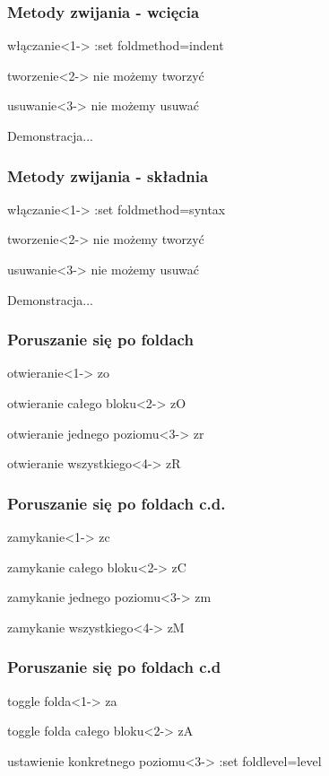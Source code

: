 \documentclass[10pt]{beamer}
\begin{document}
\begin{frame}
	\frametitle{Metody zwijania - wcięcia}
	\begin{block}{włączanie}<1->
	:set foldmethod=indent
	\end{block}
	\begin{block}{tworzenie}<2->
	nie możemy tworzyć
	\end{block}
	\begin{block}{usuwanie}<3->
	nie możemy usuwać
	\end{block}
	{
		Demonstracja...
	}
\end{frame}
\begin{frame}
	\frametitle{Metody zwijania - składnia}
	\begin{block}{włączanie}<1->
	:set foldmethod=syntax
	\end{block}
	\begin{block}{tworzenie}<2->
	nie możemy tworzyć
	\end{block}
	\begin{block}{usuwanie}<3->
	nie możemy usuwać
	\end{block}
	{
		Demonstracja...
	}
\end{frame}
\begin{frame}
	\frametitle{Poruszanie się po foldach}
	\begin{block}{otwieranie}<1->
	zo
	\end{block}
	\begin{block}{otwieranie całego bloku}<2->
	zO
	\end{block}
	\begin{block}{otwieranie jednego poziomu}<3->
	zr
	\end{block}
	\begin{block}{otwieranie wszystkiego}<4->
	zR
	\end{block}
\end{frame}
\begin{frame}
	\frametitle{Poruszanie się po foldach c.d.}
	\begin{block}{zamykanie}<1->
	zc
	\end{block}
	\begin{block}{zamykanie całego bloku}<2->
	zC
	\end{block}
	\begin{block}{zamykanie jednego poziomu}<3->
	zm
	\end{block}
	\begin{block}{zamykanie wszystkiego}<4->
	zM
	\end{block}
\end{frame}
\begin{frame}
	\frametitle{Poruszanie się po foldach c.d}
	\begin{block}{toggle folda}<1->
	za
	\end{block}
	\begin{block}{toggle folda całego bloku}<2->
	zA
	\end{block}
	\begin{block}{ustawienie konkretnego poziomu}<3->
	:set foldlevel=level
	\end{block}
\end{frame}
\end{document}

